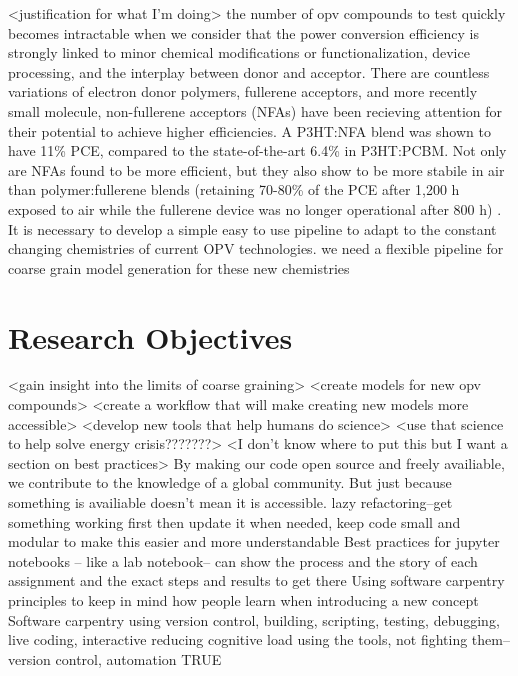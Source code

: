 <justification for what I'm doing>
the number of opv compounds to test quickly becomes intractable when we consider that the power conversion efficiency is strongly linked to minor chemical modifications or functionalization, device processing, and the interplay between donor and acceptor\cite{Mazzio2015,Swick2019a}.
There are countless variations of electron donor polymers, fullerene acceptors, and more recently small molecule, non-fullerene acceptors (NFAs) have been recieving attention for their potential to achieve higher efficiencies\cite{Dou2013}.
A P3HT:NFA blend was shown to have 11\% PCE, compared to the state-of-the-art 6.4\% in P3HT:PCBM. \cite{Baran2017}
Not only are NFAs found to be more efficient, but they also show to be more stabile in air than polymer:fullerene blends (retaining 70-80\% of the PCE after 1,200 h exposed to air while the fullerene device was no longer operational after 800 h) \cite{Baran2017}.
It is necessary to develop a simple easy to use pipeline to adapt to the constant changing chemistries of current OPV technologies. 
we need a flexible pipeline for coarse grain model generation for these new chemistries

\section*{Research Objectives}
<gain insight into the limits of coarse graining>
<create models for new opv compounds>
<create a workflow that will make creating new models more accessible>
<develop new tools that help humans do science>
<use that science to help solve energy crisis???????>
<I don't know where to put this but I want a section on best practices>
By making our code open source and freely availiable, we contribute to the knowledge of a global community. But just because something is availiable doesn't mean it is accessible. 
lazy refactoring--get something working first then update it when needed, keep code small and modular to make this easier and more understandable\cite{Adorf2018a} 
Best practices for jupyter notebooks -- like a lab notebook-- can show the process and the story of each assignment and the exact steps and results to get there\cite{Rule2019a}
Using software carpentry principles to keep in mind how people learn when introducing a new concept\cite{https://v4.software-carpentry.org/softeng/principles.html}
Software carpentry using version control, building, scripting, testing, debugging,\cite{Wilson2006}
live coding, interactive \cite{Wilson2016}
reducing cognitive load \cite{Jankowski2019}
using the tools, not fighting them--version control, automation \cite{Wilson2014}
TRUE\cite{Thompson2020}


